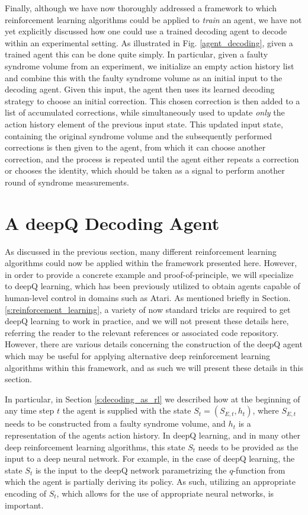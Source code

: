 \documentclass[twocolumn,preprintnumbers,amsmath,amssymb,notitlepage,nofootinbib,longbibliography,superscriptaddress,aps,pra,10pt]{revtex4-1}
\begin{document}
    Finally, although we have now thoroughly addressed a framework to which reinforcement learning algorithms could be applied to \textit{train} an agent, we have not yet explicitly discussed how one could use a trained decoding agent to decode within an experimental setting.
    As illustrated in Fig. \ref{agent_decoding}, given a trained agent this can be done quite simply.
    In particular, given a faulty syndrome volume from an experiment, we initialize an empty action history list and combine this with the faulty syndrome volume as an initial input to the decoding agent.
    Given this input, the agent then uses its learned decoding strategy to choose an initial correction.
    This chosen correction is then added to a list of accumulated corrections, while simultaneously used to update \textit{only} the action history element of the previous input state.
    This updated input state, containing the original syndrome volume and the subsequently performed corrections is then given to the agent, from which it can choose another correction, and the process is repeated until the agent either repeats a correction or chooses the identity, which should be taken as a signal to perform another round of syndrome measurements.

\section{A deepQ Decoding Agent}\label{s:dq_agent}

    As discussed in the previous section, many different reinforcement learning algorithms could now be applied within the framework presented here. 
    However, in order to provide a concrete example and proof-of-principle, we will specialize to deepQ learning, which has been previously utilized to obtain agents capable of human-level control in domains such as Atari.
    As mentioned briefly in Section. \ref{s:reinforcement_learning}, a variety of now standard tricks are required to get deepQ learning to work in practice, and we will not present these details here, referring the reader to the relevant references or associated code repository.
    However, there are various details concerning the construction of the deepQ agent which may be useful for applying alternative deep reinforcement learning algorithms within this framework, and as such we will present these details in this section.

    In particular, in Section \ref{s:decoding_as_rl} we described how at the beginning of any time step $t$ the agent is supplied with the state $S_{t}=(S_{E,{t}},h_{t})$, where $S_{E,{t}}$ needs to be constructed from a faulty syndrome volume, and $h_{t}$ is a representation of the agents action history.
    In deepQ learning, and in many other deep reinforcement learning algorithms, this state $S_t$ needs to be provided as the input to a deep neural network.
    For example, in the case of deepQ learning, the state $S_t$ is the input to the deepQ network parametrizing the $q$-function from which the agent is partially deriving its policy.
    As such, utilizing an appropriate encoding of $S_t$, which allows for the use of appropriate neural networks, is important.
\end{document}
